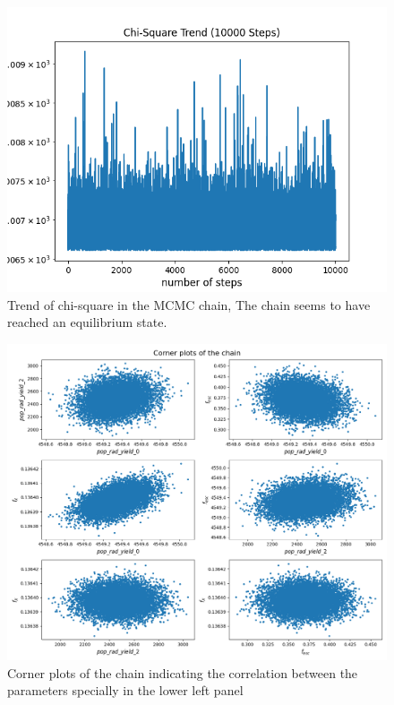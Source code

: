 \documentclass[12pt, TexShade, letterpaper]{report}
\begin{document}
\begin{figure}[h!]
\centering
\includegraphics[scale =0.6]{csq_trend_edges.png}
\caption[Trend of chi-square]{Trend of chi-square in the MCMC chain, The chain seems to have reached an equilibrium state.}
\label{fig:csq_trend_knwon_curve}
\end{figure}

\begin{figure}[h!]
\centering
\includegraphics[scale =0.5]{corner_plots_edges.png}
\caption[Corner plots of the chain]{Corner plots of the chain indicating the correlation between the parameters specially in the lower left panel}
\label{fig:corner_plots_known_curve}
\end{figure}
\end{document}
